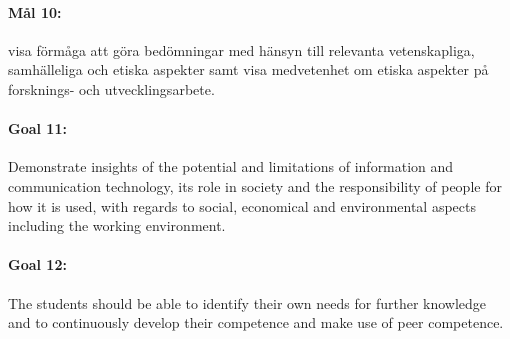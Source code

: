 \paragraph{Mål 10:} visa förmåga att göra bedömningar med hänsyn till
relevanta vetenskapliga, samhälleliga och etiska aspekter samt visa
medvetenhet om etiska aspekter på forsknings- och utvecklingsarbete.

% 
% 

\paragraph{Goal 11:} Demonstrate insights of the potential and
limitations of information and communication technology, its role in
society and the responsibility of people for how it is used, with
regards to social, economical and environmental aspects including the
working environment.

% 
% 
% 
\paragraph{Goal 12:} The students should be able to identify their own
needs for further knowledge and to continuously develop their
competence and make use of peer competence.

% 
% 
% 


